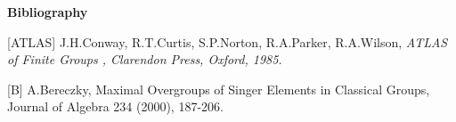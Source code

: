 \documentclass[11pt,a4paper,oneside]{article}
\begin{document}

\setcounter{page}{2}

\onehalfspacing
{}
\onehalfspacing

% 





\pagebreak

{\Huge \bf Bibliography}

\bigskip



[ATLAS] J.H.Conway, R.T.Curtis, S.P.Norton, R.A.Parker, R.A.Wilson, \it ATLAS of Finite Groups \rm, Clarendon Press, Oxford, 1985.

[B] A.Bereczky, Maximal Overgroups of Singer Elements in Classical Groups, Journal of Algebra 234 (2000), 187-206.
\end{document}
